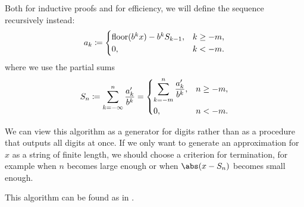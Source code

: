 \begin{algorithm}
\begin{thmenum}
     Both for inductive proofs and for efficiency, we will define the sequence recursively instead:
    \begin{equation}\label{eq:alg:real_number_radix_expansion/recursive}
      a_k \coloneqq \begin{cases}
        \operatorname{floor}(b^k x) - b^k S_{k - 1}, &k \geq -m, \\
        0,                             &k < -m.
      \end{cases}
    \end{equation}
    where we use the partial sums
    \begin{equation*}
      S_n
      \coloneqq
      \sum_{k=-\infty}^n \frac {a'_k} {b^k}
      =
      \begin{dcases}
        \sum_{k=-m}^n \frac {a'_k} {b^k}, &n \geq -m, \\
        0,                                &n < -m.
      \end{dcases}
    \end{equation*}
  \end{thmenum}
\end{algorithm}
\begin{comments}
  \item We can view this algorithm as a generator for digits rather than as a procedure that outputs all digits at once. If we only want to generate an approximation for \( x \) as a string of finite length, we should choose a criterion for termination, for example when \( n \) becomes large enough or when \( \abs(x - S_n) \) becomes small enough.

  \item This algorithm can be found as  in \cite{code}.
\end{comments}
